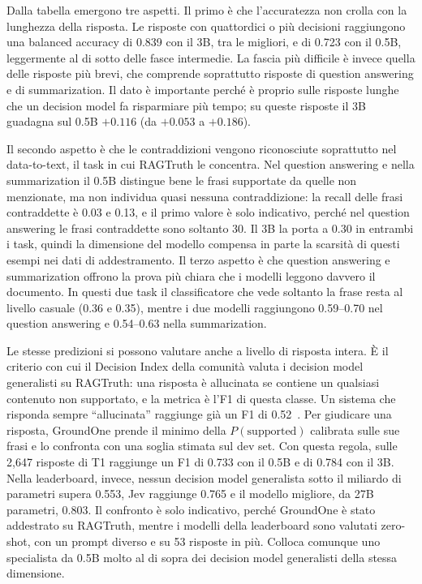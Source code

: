 Dalla tabella emergono tre aspetti. Il primo è che l'accuratezza non crolla con la lunghezza della risposta. Le risposte con quattordici o più decisioni raggiungono una balanced accuracy di 0.839 con il 3B, tra le migliori, e di 0.723 con il 0.5B, leggermente al di sotto delle fasce intermedie. La fascia più difficile è invece quella delle risposte più brevi, che comprende soprattutto risposte
di question answering e di summarization. Il dato è importante perché è proprio sulle risposte lunghe che un decision model
fa risparmiare più tempo; su queste risposte il 3B guadagna sul 0.5B $+0.116$ (da $+0.053$ a $+0.186$).

Il secondo aspetto è che le contraddizioni vengono riconosciute soprattutto nel data-to-text, il task in cui RAGTruth le
concentra. Nel question answering e nella summarization il 0.5B distingue bene le frasi supportate da quelle non
menzionate, ma non individua quasi nessuna contraddizione: la recall delle frasi contraddette è 0.03 e 0.13, e il primo valore è solo indicativo, perché nel question answering le frasi contraddette sono soltanto 30. Il 3B la
porta a 0.30 in entrambi i task, quindi la dimensione del modello compensa in parte la scarsità di questi esempi nei
dati di addestramento. Il terzo aspetto è che question answering e summarization offrono la prova più chiara che i
modelli leggono davvero il documento. In questi due task il classificatore che vede soltanto la frase resta al livello
casuale (0.36 e 0.35), mentre i due modelli raggiungono 0.59--0.70 nel question answering e 0.54--0.63 nella
summarization.

Le stesse predizioni si possono valutare anche a livello di risposta intera. È il criterio con cui il Decision Index
della comunità valuta i decision model generalisti su RAGTruth: una risposta è allucinata se contiene un qualsiasi
contenuto non supportato, e la metrica è l'F1 di questa classe. Un sistema che risponda sempre ``allucinata'' raggiunge
già un F1 di 0.52~\cite{decisionindex2026}. Per giudicare una risposta, GroundOne prende il minimo della
$P(\text{supported})$ calibrata sulle sue frasi e lo confronta con una soglia stimata sul dev set. Con questa regola,
sulle 2{,}647 risposte di T1 raggiunge un F1 di 0.733 con il 0.5B e di 0.784 con il 3B. Nella leaderboard, invece,
nessun decision model generalista sotto il miliardo di parametri supera 0.553, Jev raggiunge 0.765 e il modello migliore,
da 27B parametri, 0.803. Il confronto è solo indicativo, perché GroundOne è stato addestrato su RAGTruth, mentre i
modelli della leaderboard sono valutati zero-shot, con un prompt diverso e su 53 risposte in più. Colloca comunque uno
specialista da 0.5B molto al di sopra dei decision model generalisti della stessa dimensione.

